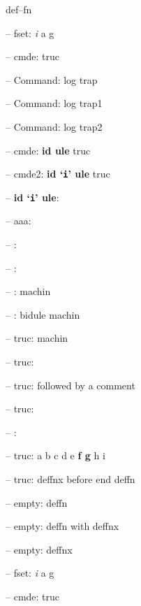 \documentclass{book}
\begin{document}
\begin{titlepage}
%
def--fn

\hbox{}-- fset: \emph{i} a g


%
%
\hbox{}-- cmde: truc 


%
\hbox{}-- Command: log trap 


%
\hbox{}-- Command: log trap1 


%
\hbox{}-- Command: log trap2 


%
\hbox{}-- cmde: \textbf{id ule} truc


%
\hbox{}-- cmde2: \textbf{id `\texttt{i}' ule} truc


%
\hbox{}-- \textbf{id `\texttt{i}' ule}: 



\hbox{}-- aaa: 


\hbox{}-- : 


\hbox{}-- : 


\hbox{}-- : machin


%
\hbox{}-- : bidule machin


%
\hbox{}-- truc: machin


%
\hbox{}-- truc: 


\hbox{}-- truc: followed by a comment


%
\hbox{}-- truc: 


\hbox{}-- : 


\hbox{}-- truc: a b c d e \textbf{f g} h i


%
\hbox{}-- truc: deffnx before end deffn


%


\hbox{}-- empty: deffn


%

\hbox{}-- empty: deffn with deffnx


%
\hbox{}-- empty: deffnx


%

\hbox{}-- fset: \emph{i} a g


%
\hbox{}-- cmde: truc 



\end{titlepage}
\end{document}
